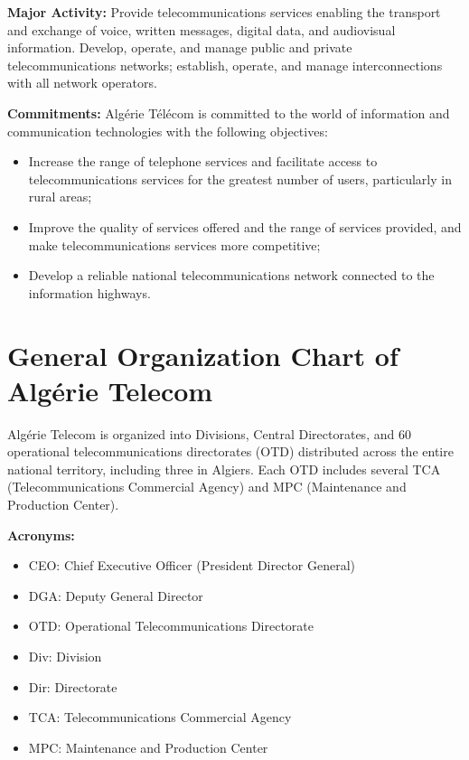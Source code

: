 \textbf{Major Activity:} Provide telecommunications services enabling the transport and exchange of voice, written messages, digital data, and audiovisual information. Develop, operate, and manage public and private telecommunications networks; establish, operate, and manage interconnections with all network operators.

\textbf{Commitments:} Algérie Télécom is committed to the world of information and communication technologies with the following objectives:
\begin{itemize}
    \item Increase the range of telephone services and facilitate access to telecommunications services for the greatest number of users, particularly in rural areas;
    \item Improve the quality of services offered and the range of services provided, and make telecommunications services more competitive;
    \item Develop a reliable national telecommunications network connected to the information highways.
\end{itemize}

\section{General Organization Chart of Algérie Telecom}
\label{subsec:organisation}

Algérie Telecom is organized into Divisions, Central Directorates, and 60 operational telecommunications directorates (OTD) distributed across the entire national territory, including three in Algiers. Each OTD includes several TCA (Telecommunications Commercial Agency) and MPC (Maintenance and Production Center).

\textbf{Acronyms:}
\begin{itemize}
    \setlength{\itemsep}{4pt}
    \setlength{\parskip}{4pt}
    \setlength{\parsep}{4pt}
    \item CEO: Chief Executive Officer (President Director General)
    \item DGA: Deputy General Director
    \item OTD: Operational Telecommunications Directorate
    \item Div: Division
    \item Dir: Directorate
    \item TCA: Telecommunications Commercial Agency
    \item MPC: Maintenance and Production Center
\end{itemize}

